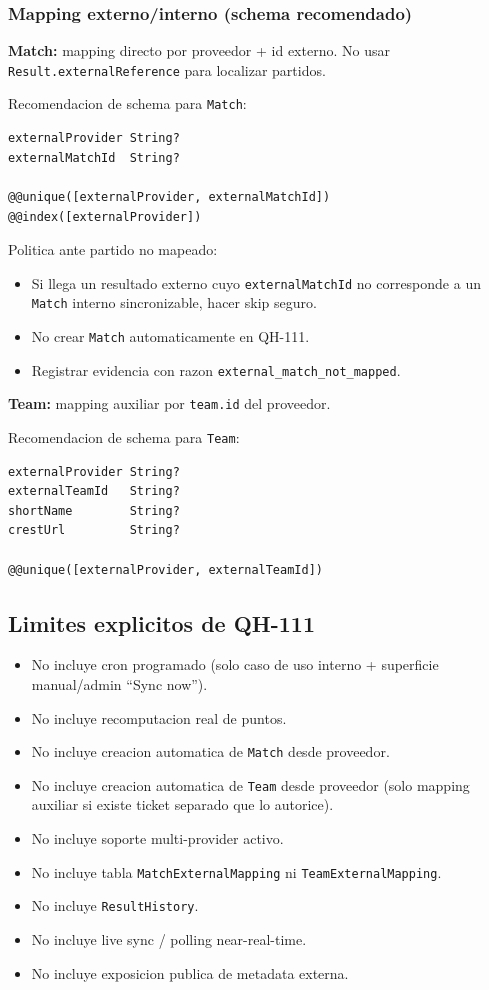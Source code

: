 \subsubsection{Mapping externo/interno (schema recomendado)}

\textbf{Match:} mapping directo por proveedor + id externo. No usar \texttt{Result.externalReference} para localizar partidos.

Recomendacion de schema para \texttt{Match}:
\begin{verbatim}
externalProvider String?
externalMatchId  String?

@@unique([externalProvider, externalMatchId])
@@index([externalProvider])
\end{verbatim}

Politica ante partido no mapeado:
\begin{itemize}
  \item Si llega un resultado externo cuyo \texttt{externalMatchId} no corresponde a un \texttt{Match} interno sincronizable, hacer skip seguro.
  \item No crear \texttt{Match} automaticamente en QH-111.
  \item Registrar evidencia con razon \texttt{external\_match\_not\_mapped}.
\end{itemize}

\textbf{Team:} mapping auxiliar por \texttt{team.id} del proveedor.

Recomendacion de schema para \texttt{Team}:
\begin{verbatim}
externalProvider String?
externalTeamId   String?
shortName        String?
crestUrl         String?

@@unique([externalProvider, externalTeamId])
\end{verbatim}

\subsection{Limites explicitos de QH-111}

\begin{itemize}
  \item No incluye cron programado (solo caso de uso interno + superficie manual/admin ``Sync now'').
  \item No incluye recomputacion real de puntos.
  \item No incluye creacion automatica de \texttt{Match} desde proveedor.
  \item No incluye creacion automatica de \texttt{Team} desde proveedor (solo mapping auxiliar si existe ticket separado que lo autorice).
  \item No incluye soporte multi-provider activo.
  \item No incluye tabla \texttt{MatchExternalMapping} ni \texttt{TeamExternalMapping}.
  \item No incluye \texttt{ResultHistory}.
  \item No incluye live sync / polling near-real-time.
  \item No incluye exposicion publica de metadata externa.
\end{itemize}

